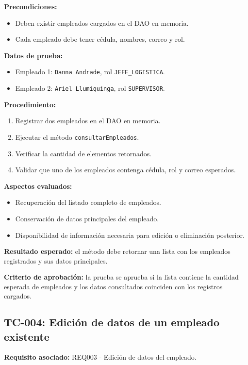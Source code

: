 \documentclass[12pt,a4paper]{article}
\begin{document}
\textbf{Precondiciones:}
\begin{itemize}[leftmargin=*]
    \item Deben existir empleados cargados en el DAO en memoria.
    \item Cada empleado debe tener cédula, nombres, correo y rol.
\end{itemize}

\textbf{Datos de prueba:}
\begin{itemize}[leftmargin=*]
    \item Empleado 1: \texttt{Danna Andrade}, rol \texttt{JEFE\_LOGISTICA}.
    \item Empleado 2: \texttt{Ariel Llumiquinga}, rol \texttt{SUPERVISOR}.
\end{itemize}

\textbf{Procedimiento:}
\begin{enumerate}[leftmargin=*]
    \item Registrar dos empleados en el DAO en memoria.
    \item Ejecutar el método \texttt{consultarEmpleados}.
    \item Verificar la cantidad de elementos retornados.
    \item Validar que uno de los empleados contenga cédula, rol y correo esperados.
\end{enumerate}

\textbf{Aspectos evaluados:}
\begin{itemize}[leftmargin=*]
    \item Recuperación del listado completo de empleados.
    \item Conservación de datos principales del empleado.
    \item Disponibilidad de información necesaria para edición o eliminación posterior.
\end{itemize}

\textbf{Resultado esperado:} el método debe retornar una lista con los empleados registrados y sus datos principales.

\textbf{Criterio de aprobación:} la prueba se aprueba si la lista contiene la cantidad esperada de empleados y los datos consultados coinciden con los registros cargados.

\subsection{TC-004: Edición de datos de un empleado existente}

\textbf{Requisito asociado:} REQ003 - Edición de datos del empleado.
\end{document}
